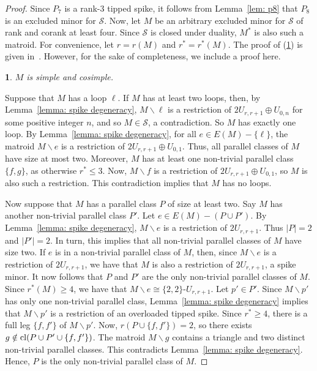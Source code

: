 \documentclass[11pt]{amsart}
\newtheorem{sublemma}{}[theorem]
\numberwithin{equation}{section} %
\newcommand{\cl}{{\rm cl}}
\newcommand{\cS}{\mathcal{S}}
\begin{document}
\begin{proof}
Since $P_7$ is a rank-$3$ tipped spike, it follows from Lemma~\ref{lem: p8} that $P_8$ is an excluded minor for $\cS$. Now, let $M$ be an arbitrary excluded minor for $\cS$ of rank and corank at least four. Since $\cS$ is closed under duality, $M^*$ is also such a matroid. For convenience, let $r=r(M)$ and $r^*=r^*(M)$. The proof of (\ref{simple}) is given in~\cite[Lemma 3.9]{may21}. However, for the sake of completeness, we include a proof here.

\begin{sublemma}
$M$ is simple and cosimple.
\label{simple}
\end{sublemma}

Suppose that $M$ has a loop $\ell$. If $M$ has at least two loops, then, by Lemma~\ref{lemma: spike degeneracy}, $M\backslash \ell$ is a restriction of $2U_{r, r+1}\oplus U_{0, n}$ for some positive integer $n$, and so $M\in \cS$, a contradiction. So $M$ has exactly one loop. By Lemma~\ref{lemma: spike degeneracy}, for all $e\in E(M)-\{\ell\}$, the matroid $M\backslash e$ is a restriction of $2U_{r, r+1}\oplus U_{0, 1}$. Thus, all parallel classes of $M$ have size at most two. Moreover, $M$ has at least one non-trivial parallel class $\{f,g\}$, as otherwise $r^* \leq 3$. Now, $M\backslash f$ is a restriction of $2U_{r, r+1}\oplus U_{0, 1}$, so $M$ is also such a restriction. This contradiction implies that $M$ has no loops.

Now suppose that $M$ has a parallel class $P$ of size at least two. Say $M$ has another non-trivial parallel class $P'$. Let $e\in E(M)-(P\cup P')$. By Lemma~\ref{lemma: spike degeneracy}, $M\backslash e$ is a restriction of $2U_{r, r+1}$. Thus $|P|=2$ and $|P'|=2$. In turn, this implies that all non-trivial parallel classes of $M$ have size two. If $e$ is in a non-trivial parallel class of $M$, then, since $M \backslash e$ is a restriction of $2U_{r,r+1}$, we have that $M$ is also a restriction of $2U_{r,r+1}$, a spike minor. It now follows that $P$ and $P'$ are the only non-trivial parallel classes of $M$. Since $r^*(M)\ge 4$, we have that $M\backslash e \cong \{2, 2\}$-$U_{r, r+1}$. Let $p' \in P'$. Since $M \backslash p'$ has only one non-trivial parallel class, Lemma~\ref{lemma: spike degeneracy} implies that $M \backslash p'$ is a restriction of an overloaded tipped spike. Since $r^* \geq 4$, there is a full leg $\{f,f'\}$ of $M \backslash p'$. Now, $r(P \cup \{f,f'\}) = 2$, so there exists $g \notin \cl(P \cup P' \cup \{f,f'\})$. The matroid $M \backslash g$ contains a triangle and two distinct non-trivial parallel classes. This contradicts Lemma~\ref{lemma: spike degeneracy}. Hence, $P$ is the only non-trivial parallel class of $M$.


\end{proof}
\end{document}
